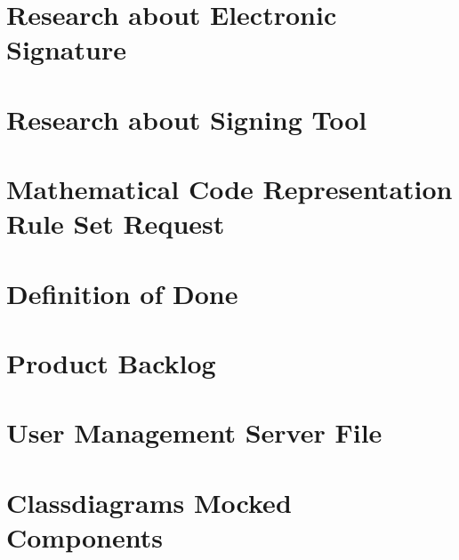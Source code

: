 	\chapter{Research about Electronic Signature}
	\label{res:es}
	
	
	\chapter{Research about Signing Tool}
	\label{res:tool}
	
	
	\chapter{Mathematical Code Representation Rule Set Request}
	\label{mathCode}
	
	
	\chapter{Definition of Done}
	\label{definitionOfDone}
	
	
	\chapter{Product Backlog}
	\label{productBacklog}
	
	
	\chapter{User Management Server File}
	\label{ap:userManagement}
	
	
	\chapter{Classdiagrams Mocked Components}
	
	
